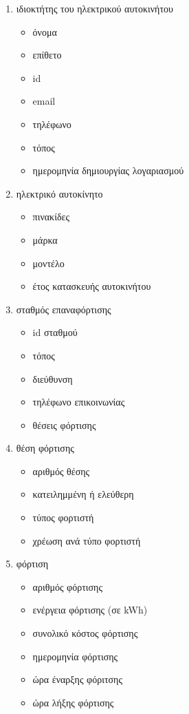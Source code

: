 \documentclass[manuscript,screen,review]{acmart}
\newcommand{\en}[1]{\foreignlanguage{english}{#1}}
\begin{document}
 \begin{enumerate}
	\item ιδιοκτήτης του ηλεκτρικού αυτοκινήτου
	\begin{itemize}
		\item όνομα
		\item επίθετο
		\item \en{id}
		\item \en{email}
		\item τηλέφωνο
		\item τόπος
		\item ημερομηνία δημιουργίας λογαριασμού
	\end{itemize}
	\item ηλεκτρικό αυτοκίνητο
	\begin{itemize}
		\item πινακίδες
		\item μάρκα
		\item μοντέλο
		\item έτος κατασκευής αυτοκινήτου
	\end{itemize}
	\item σταθμός επαναφόρτισης
	\begin{itemize}
		\item \en{id} σταθμού
		\item τόπος
		\item διεύθυνση
		\item τηλέφωνο επικοινωνίας
		\item θέσεις φόρτισης
	\end{itemize}
	\item θέση φόρτισης 
	\begin{itemize}
		\item αριθμός θέσης
		\item κατειλημμένη ή ελεύθερη
		\item τύπος φορτιστή
		\item χρέωση ανά τύπο φορτιστή
	\end{itemize}
 \newpage
	\item φόρτιση
	\begin{itemize}
		\item αριθμός φόρτισης
		\item ενέργεια φόρτισης (σε \en{kWh})
		\item συνολικό κόστος φόρτισης
		\item ημερομηνία φόρτισης
		\item ώρα έναρξης φόριτσης
		\item ώρα λήξης φόρτισης
	\end{itemize}

\end{enumerate}
\end{document}
